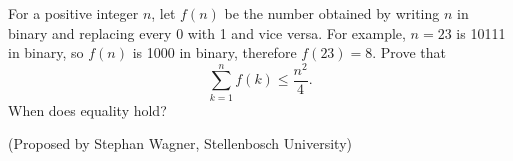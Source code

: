 For a positive integer $n$, let $f(n)$ be the number obtained by
writing $n$ in binary and replacing every 0 with 1 and vice
versa. For example, $n=23$ is 10111 in binary, so $f(n)$ is 1000 in
binary, therefore $f(23) =8$. Prove that
\[\sum_{k=1}^n f(k) \leq \frac{n^2}{4}.\]
When does equality hold?

(Proposed by Stephan Wagner, Stellenbosch University)